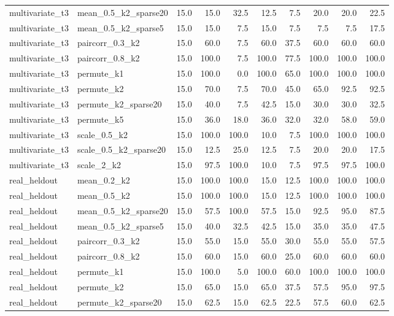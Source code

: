 \begin{table}[!tp]
{\begin{tabular}{llrrrrrrrr}
multivariate\_t3 & mean\_0.5\_k2\_sparse20 & 15.0 & 15.0 & 32.5 & 12.5 & 7.5 & 20.0 & 20.0 & 22.5 \\
multivariate\_t3 & mean\_0.5\_k2\_sparse5 & 15.0 & 15.0 & 7.5 & 15.0 & 7.5 & 7.5 & 7.5 & 17.5 \\
multivariate\_t3 & paircorr\_0.3\_k2 & 15.0 & 60.0 & 7.5 & 60.0 & 37.5 & 60.0 & 60.0 & 60.0 \\
multivariate\_t3 & paircorr\_0.8\_k2 & 15.0 & 100.0 & 7.5 & 100.0 & 77.5 & 100.0 & 100.0 & 100.0 \\
multivariate\_t3 & permute\_k1 & 15.0 & 100.0 & 0.0 & 100.0 & 65.0 & 100.0 & 100.0 & 100.0 \\
multivariate\_t3 & permute\_k2 & 15.0 & 70.0 & 7.5 & 70.0 & 45.0 & 65.0 & 92.5 & 92.5 \\
multivariate\_t3 & permute\_k2\_sparse20 & 15.0 & 40.0 & 7.5 & 42.5 & 15.0 & 30.0 & 30.0 & 32.5 \\
multivariate\_t3 & permute\_k5 & 15.0 & 36.0 & 18.0 & 36.0 & 32.0 & 32.0 & 58.0 & 59.0 \\
multivariate\_t3 & scale\_0.5\_k2 & 15.0 & 100.0 & 100.0 & 10.0 & 7.5 & 100.0 & 100.0 & 100.0 \\
multivariate\_t3 & scale\_0.5\_k2\_sparse20 & 15.0 & 12.5 & 25.0 & 12.5 & 7.5 & 20.0 & 20.0 & 17.5 \\
multivariate\_t3 & scale\_2\_k2 & 15.0 & 97.5 & 100.0 & 10.0 & 7.5 & 97.5 & 97.5 & 100.0 \\
\midrule
real\_heldout & mean\_0.2\_k2 & 15.0 & 100.0 & 100.0 & 15.0 & 12.5 & 100.0 & 100.0 & 100.0 \\
real\_heldout & mean\_0.5\_k2 & 15.0 & 100.0 & 100.0 & 15.0 & 12.5 & 100.0 & 100.0 & 100.0 \\
real\_heldout & mean\_0.5\_k2\_sparse20 & 15.0 & 57.5 & 100.0 & 57.5 & 15.0 & 92.5 & 95.0 & 87.5 \\
real\_heldout & mean\_0.5\_k2\_sparse5 & 15.0 & 40.0 & 32.5 & 42.5 & 15.0 & 35.0 & 35.0 & 47.5 \\
real\_heldout & paircorr\_0.3\_k2 & 15.0 & 55.0 & 15.0 & 55.0 & 30.0 & 55.0 & 55.0 & 57.5 \\
real\_heldout & paircorr\_0.8\_k2 & 15.0 & 60.0 & 15.0 & 60.0 & 25.0 & 60.0 & 60.0 & 60.0 \\
real\_heldout & permute\_k1 & 15.0 & 100.0 & 5.0 & 100.0 & 60.0 & 100.0 & 100.0 & 100.0 \\
real\_heldout & permute\_k2 & 15.0 & 65.0 & 15.0 & 65.0 & 37.5 & 57.5 & 95.0 & 97.5 \\
real\_heldout & permute\_k2\_sparse20 & 15.0 & 62.5 & 15.0 & 62.5 & 22.5 & 57.5 & 60.0 & 62.5 \\

\end{tabular}}
\end{table}

